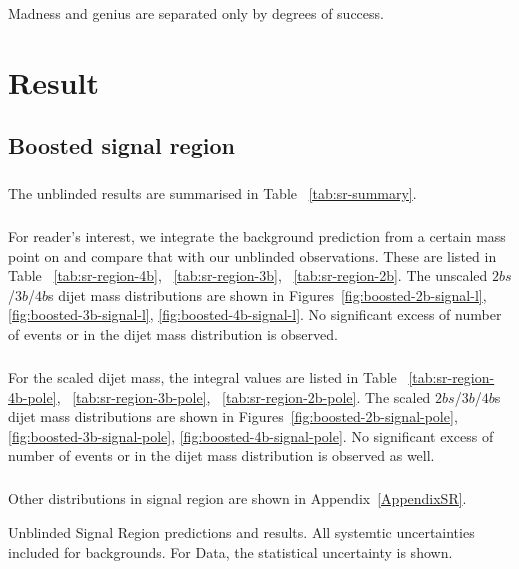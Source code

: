 \begin{savequote}[75mm]
Madness and genius are separated only by degrees of success. 
\end{savequote}

\chapter{Result}
\section{Boosted signal region}
\paragraph{}
The unblinded results are summarised in Table ~\ref{tab:sr-summary}. 

\paragraph{}
For reader's interest, we integrate the background prediction from a certain mass point on and compare that with our unblinded observations. These are listed in Table ~\ref{tab:sr-region-4b}, ~\ref{tab:sr-region-3b}, ~\ref{tab:sr-region-2b}. The unscaled $2bs$/$3b$/$4b$s dijet mass distributions are shown in Figures~\ref{fig:boosted-2b-signal-l}, \ref{fig:boosted-3b-signal-l}, \ref{fig:boosted-4b-signal-l}. No significant excess of number of events or in the dijet mass distribution is observed.

\paragraph{}
For the scaled dijet mass, the integral values are listed in Table ~\ref{tab:sr-region-4b-pole}, ~\ref{tab:sr-region-3b-pole}, ~\ref{tab:sr-region-2b-pole}. The scaled $2bs$/$3b$/$4b$s dijet mass distributions are shown in Figures~\ref{fig:boosted-2b-signal-pole}, \ref{fig:boosted-3b-signal-pole}, \ref{fig:boosted-4b-signal-pole}. No significant excess of number of events or in the dijet mass distribution is observed as well.

\paragraph{}
Other distributions in signal region are shown in Appendix~\ref{AppendixSR}.

\begin{table}[htbp!]
\scriptsize
\begin{center}

\caption{Unblinded Signal Region predictions and results. All systemtic uncertainties included for backgrounds. For Data, the statistical uncertainty is shown.}
\label{tab:sr-summary}
\end{center}
\end{table}

